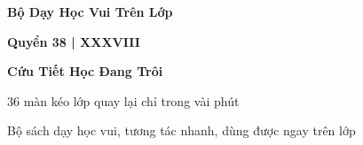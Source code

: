 \begin{titlepage}
\centering
\vspace*{2.2cm}
{\Large\bfseries\color{chapterline} Bộ Dạy Học Vui Trên Lớp\par}
\vspace{0.25cm}
{\large\bfseries\color{chapterline} Quyển 38 \;|\; XXXVIII\par}
\vspace{1cm}
{\fontsize{24}{30}\selectfont\bfseries\color{titlecolor} Cứu Tiết Học Đang Trôi\par}
\vspace{0.7cm}
{\large 36 màn kéo lớp quay lại chỉ trong vài phút\par}
\vfill
{\normalsize Bộ sách dạy học vui, tương tác nhanh, dùng được ngay trên lớp\par}
\vspace*{1.8cm}
\end{titlepage}
